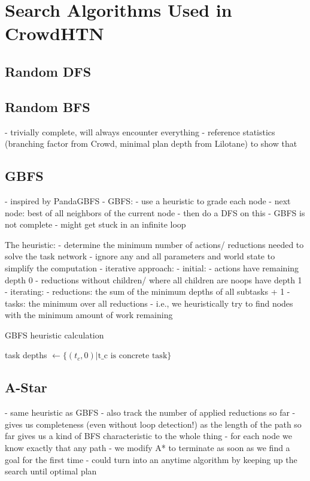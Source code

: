 \section{Search Algorithms Used in CrowdHTN}

\subsection{Random DFS}

\subsection{Random BFS}
- trivially complete, will always encounter everything
- reference statistics (branching factor from Crowd, minimal plan depth from Lilotane) to show that 

\subsection{GBFS}
- inspired by PandaGBFS
- GBFS:
	- use a heuristic to grade each node
	- next node: best of all neighbors of the current node
	- then do a DFS on this
- GBFS is not complete
- might get stuck in an infinite loop

The heuristic:
- determine the minimum number of actions/ reductions needed to solve the task network
- ignore any and all parameters and world state to simplify the computation
- iterative approach:
	- initial:
		- actions have remaining depth 0
		- reductions without children/ where all children are noops have depth 1
	- iterating:
		- reductions: the sum of the minimum depths of all subtasks + 1
		- tasks: the minimum over all reductions
- i.e., we heuristically try to find nodes with the minimum amount of work remaining

\begin{algorithm}
	\caption{GBFS heuristic calculation}
	task depths $\gets \{(t_c, 0) | \text{t_c is concrete task}\}$\;
\end{algorithm}


\subsection{A-Star}
- same heuristic as GBFS
- also track the number of applied reductions so far
- gives us completeness (even without loop detection!) as the length of the path so far gives us a kind of BFS characteristic to the whole thing
- for each node we know exactly that any path
- we modify A* to terminate as soon as we find a goal for the first time
- could turn into an anytime algorithm by keeping up the search until optimal plan
